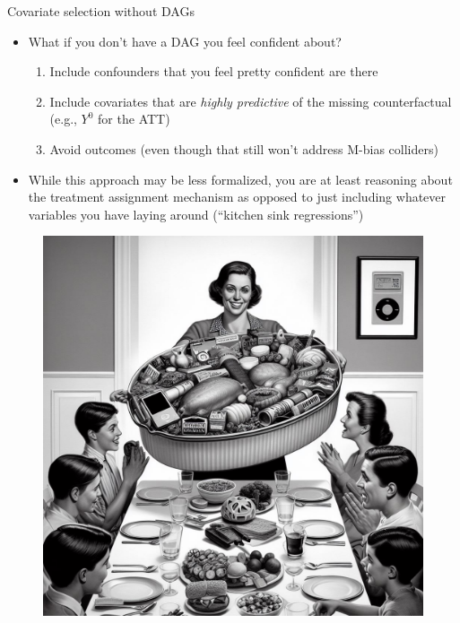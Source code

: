 \documentclass{beamer}
\begin{document}
\begin{frame}{Covariate selection without DAGs}

\begin{itemize}
\item What if you don't have a DAG you feel confident about?  
	\begin{enumerate}
	\item Include confounders that you feel pretty confident are there 
	\item Include covariates that are \emph{highly predictive} of the missing counterfactual (e.g., $Y^0$ for the ATT)
	\item Avoid outcomes (even though that still won't address M-bias colliders)
	\end{enumerate}
\item While this approach may be less formalized, you are at least reasoning about the treatment assignment mechanism as opposed to just including whatever variables you have laying around (``kitchen sink regressions'')
\end{itemize}

\end{frame}

\begin{frame}
  \begin{figure}
    \includegraphics[scale=0.25]{./lecture_includes/wrong_covariates}
  \end{figure}
\end{frame}
\end{document}
